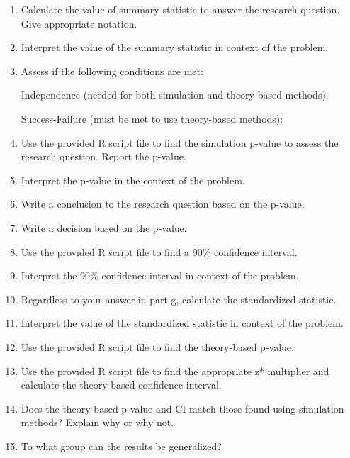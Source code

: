 \documentclass[
]{report}
\begin{document}
\begin{enumerate}
\def\labelenumi{\alph{enumi}.}
\setcounter{enumi}{4}
\item
  Calculate the value of summary statistic to answer the research question. Give appropriate notation.
  \vspace{0.3in}
\item
  Interpret the value of the summary statistic in context of the problem:
  \vspace{0.3in}
\item
  Assess if the following conditions are met:

  Independence (needed for both simulation and theory-based methods):
  \vspace{0.8in}

  Success-Failure (must be met to use theory-based methods):
  \vspace{0.8in}
\item
  Use the provided R script file to find the simulation p-value to assess the research question. Report the p-value.
  \vspace{0.3in}
\item
  Interpret the p-value in the context of the problem.
  \vspace{0.8in}
\item
  Write a conclusion to the research question based on the p-value.
  \vspace{0.8in}
\item
  Write a decision based on the p-value.
  \vspace{0.3in}
\item
  Use the provided R script file to find a 90\% confidence interval.
  \vspace{0.3in}
\item
  Interpret the 90\% confidence interval in context of the problem.
  \vspace{0.8in}
\item
  Regardless to your answer in part g, calculate the standardized statistic.
  \vspace{0.4in}
\item
  Interpret the value of the standardized statistic in context of the problem.
  \vspace{0.8in}
\item
  Use the provided R script file to find the theory-based p-value.
  \vspace{0.3in}
\item
  Use the provided R script file to find the appropriate z* multiplier and calculate the theory-based confidence interval.
  \vspace{0.5in}
\item
  Does the theory-based p-value and CI match those found using simulation methods? Explain why or why not.
  \vspace{0.8in}
\item
  To what group can the results be generalized?
  \vspace{0.8in}
\end{enumerate}
\end{document}
